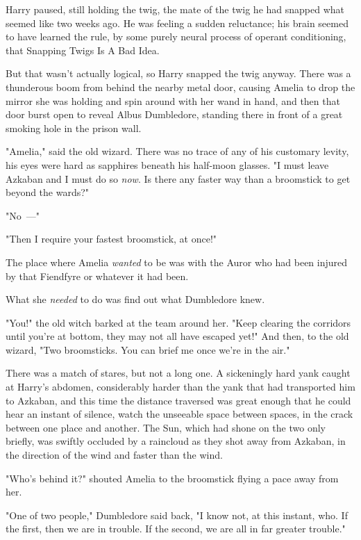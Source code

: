 Harry paused, still holding the twig, the mate of the twig he had snapped what
seemed like two weeks ago. He was feeling a sudden reluctance; his brain seemed
to have learned the rule, by some purely neural process of operant
conditioning, that Snapping Twigs Is A Bad Idea.

But that wasn't actually logical, so Harry snapped the twig anyway.
\sbreak
There was a thunderous boom from behind the nearby metal door, causing Amelia
to drop the mirror she was holding and spin around with her wand in hand, and
then that door burst open to reveal Albus Dumbledore, standing there in front
of a great smoking hole in the prison wall.

"Amelia," said the old wizard. There was no trace of any of his customary
levity, his eyes were hard as sapphires beneath his half-moon glasses. "I must
leave Azkaban and I must do so \emph{now}. Is there any faster way than a
broomstick to get beyond the wards?"

"No~---"

"Then I require your fastest broomstick, at once!"

The place where Amelia \emph{wanted} to be was with the Auror who had been
injured by that Fiendfyre or whatever it had been.

What she \emph{needed} to do was find out what Dumbledore knew.

"You!" the old witch barked at the team around her. "Keep clearing the
corridors until you're at bottom, they may not all have escaped yet!" And then,
to the old wizard, "Two broomsticks. You can brief me once we're in the air."

There was a match of stares, but not a long one.
\sbreak
A sickeningly hard yank caught at Harry's abdomen, considerably harder than the
yank that had transported him to Azkaban, and this time the distance traversed
was great enough that he could hear an instant of silence, watch the unseeable
space between spaces, in the crack between one place and another.
\sbreak
The Sun, which had shone on the two only briefly, was swiftly occluded by a
raincloud as they shot away from Azkaban, in the direction of the wind and
faster than the wind.

"Who's behind it?" shouted Amelia to the broomstick flying a pace away from her.

"One of two people," Dumbledore said back, "I know not, at this instant, who.
If the first, then we are in trouble. If the second, we are all in far greater
trouble."


